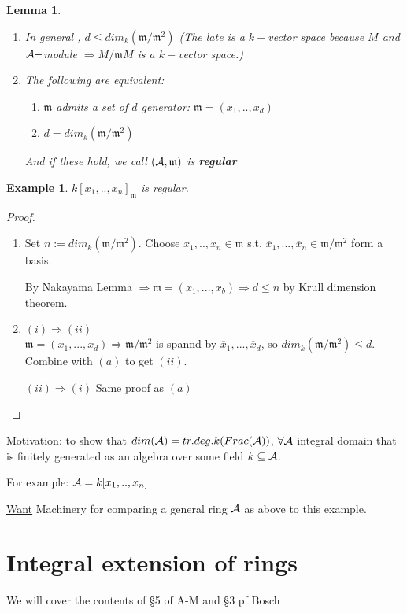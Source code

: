 \documentclass[11pt]{article}
\newtheorem{lemma}[thm]{Lemma}
\newtheorem{ex}[thm]{Example}
\newcommand{\scm}{{\mathfrak m}}
\newcommand{\cala}{{\cal A}}
\newcommand{\Lrta}{\Longrightarrow}
\begin{document}
\begin{lemma}\ 
\begin{enumerate}[label=(\alph*)]
\item In general , $d\leq dim_k(\scm/\scm^2)$ (The late is a $k-$vector space because $M$ and $\cala-$module $\Lrta M/\scm M$ is a $k-$vector space.)
\item The following are equivalent:
    \begin{enumerate}[label=(\roman*)]
        \item $\scm$ admits a set of $d$ generator: $\scm=(x_1,..,x_d)$
        \item $d=dim_k(\scm/\scm^2)$
    \end{enumerate}
    And if these hold, we call $(\cala,\scm)$ is \textbf{regular}
\end{enumerate}
\end{lemma}
\begin{ex}
$k[x_1,..,x_n]_\scm$ is regular.
\end{ex}
\begin{proof}\ 
\begin{enumerate}[label=(\alph*)]
\item Set $n:=dim_k(\scm/\scm^2)$. Choose $x_1,..,x_n\in\scm$ s.t. $\overline{x}_1,...,\overline{x}_n\in \scm/\scm^2$ form a basis.

By Nakayama Lemma $\Lrta\scm=(x_1,...,x_b)\Lrta d\leq n$ by Krull dimension theorem.

\item $(i)\Lrta (ii)$\\
$\scm=(x_1,...,x_d)\Lrta \scm/\scm^2 $ is spannd by $\overline{x}_1,...,\overline{x}_d$, so $dim_k(\scm/\scm^2)\leq d$. Combine with $(a)$ to get $(ii)$.

$(ii)\Lrta (i)$ Same proof as $(a)$

\end{enumerate}
\end{proof}


Motivation: to show that $dim(\cala)=tr.deg.k(Frac(\cala))$, $\forall\cala$ integral domain that is finitely generated as an algebra over some field $k\subseteq\cala$.

For example: $\cala=k[x_1,..,x_n]$

\underline{Want} Machinery for comparing a general ring $\cala$ as above to this example.

\section{Integral extension of rings}
We will cover the contents of \S 5 of A-M and \S 3 pf Bosch
\end{document}
